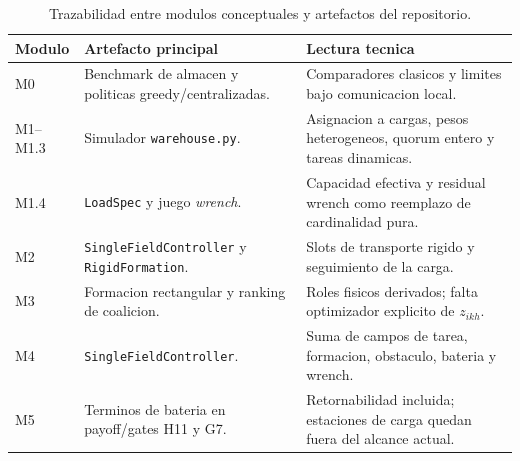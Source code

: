 \begin{table}[H]
\centering
\footnotesize
\begin{tabularx}{\textwidth}{@{}p{}p{}Y@{}}
\toprule
Modulo & Artefacto principal & Lectura tecnica \\
\midrule
M0 & Benchmark de almacen y politicas greedy/centralizadas. & Comparadores clasicos y limites bajo comunicacion local. \\
M1--M1.3 & Simulador \texttt{warehouse.py}. & Asignacion a cargas, pesos heterogeneos, quorum entero y tareas dinamicas. \\
M1.4 & \texttt{LoadSpec} y juego \emph{wrench}. & Capacidad efectiva y residual wrench como reemplazo de cardinalidad pura. \\
M2 & \texttt{SingleFieldController} y \texttt{RigidFormation}. & Slots de transporte rigido y seguimiento de la carga. \\
M3 & Formacion rectangular y ranking de coalicion. & Roles fisicos derivados; falta optimizador explicito de $z_{ikh}$. \\
M4 & \texttt{SingleFieldController}. & Suma de campos de tarea, formacion, obstaculo, bateria y wrench. \\
M5 & Terminos de bateria en payoff/gates H11 y G7. & Retornabilidad incluida; estaciones de carga quedan fuera del alcance actual. \\
\bottomrule
\end{tabularx}
\caption{Trazabilidad entre modulos conceptuales y artefactos del repositorio.}
\label{tab:implementacion-modular}
\end{table}
